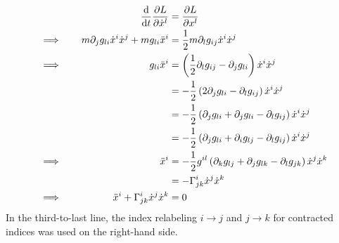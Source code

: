 \documentclass[12pt]{article}
\newcommand{\chrissym}[3]{\Gamma_{#2#3}^#1}
\newcommand{\partialg}[3]{\partial_{#1}g_{#2#3}}
\begin{document}
\begin{alignat*}{3}
    &         \quad & \dv{t}\pdv{L}{\dot{x}^l} &= \pdv{L}{x^l} \\
    &\implies \quad & m \partialg{j}{l}{i}\dot{x}^i\dot{x}^j + mg_{li}\ddot{x}^i &= \frac{1}{2}m\partialg{l}{i}{j}\dot{x}^i\dot{x}^j \\
    &\implies \quad & g_{li}\ddot{x}^i &= \left(\frac{1}{2}\partialg{l}{i}{j} - \partialg{j}{l}{i} \right)\dot{x}^i\dot{x}^j \\
    &         \quad &  &= -\frac{1}{2}\left(2\partialg{j}{l}{i} - \partialg{l}{i}{j}\right)\dot{x}^i\dot{x}^j \\
    &         \quad &  &= -\frac{1}{2}\left(\partialg{j}{l}{i} + \partialg{j}{l}{i} - \partialg{l}{i}{j}\right)\dot{x}^i\dot{x}^j \\
    &         \quad &  &= -\frac{1}{2}\left(\partialg{j}{l}{i} + \partialg{i}{l}{j} - \partialg{l}{i}{j}\right)\dot{x}^i\dot{x}^j \\
    &\implies \quad & \ddot{x}^i &= -\frac{1}{2}g^{il}\left(\partialg{k}{l}{j} + \partialg{j}{l}{k} - \partialg{l}{j}{k}\right)\dot{x}^j\dot{x}^k \\
    &         \quad &  &= -\chrissym{i}{j}{k}\dot{x}^j\dot{x}^k \\
    &\implies \quad & \ddot{x}^i + \chrissym{i}{j}{k}\dot{x}^j\dot{x}^k &= 0
\end{alignat*}
In the third-to-last line, the index relabeling $i \to j$ and $j \to k$ for contracted indices was used on the right-hand side.
\end{document}
